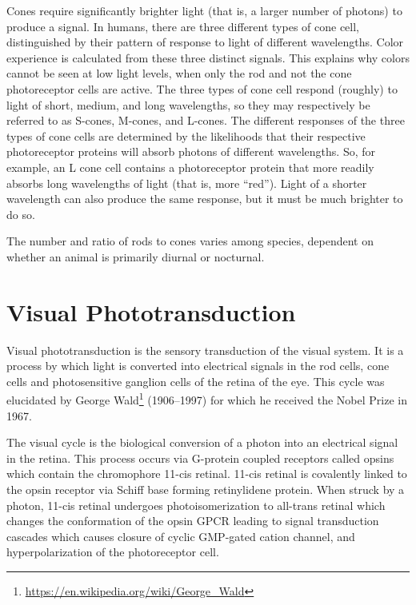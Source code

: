 \documentclass[]{book}
\let\rmarkdownfootnote\footnote%
\def\footnote{\protect\rmarkdownfootnote}
\renewcommand{\href}[2]{#2\footnote{\url{#1}}}
\begin{document}
Cones require significantly brighter light (that is, a larger number of photons) to produce a signal. In humans, there are three different types of cone cell, distinguished by their pattern of response to light of different wavelengths. Color experience is calculated from these three distinct signals. This explains why colors cannot be seen at low light levels, when only the rod and not the cone photoreceptor cells are active. The three types of cone cell respond (roughly) to light of short, medium, and long wavelengths, so they may respectively be referred to as S-cones, M-cones, and L-cones. The different responses of the three types of cone cells are determined by the likelihoods that their respective photoreceptor proteins will absorb photons of different wavelengths. So, for example, an L cone cell contains a photoreceptor protein that more readily absorbs long wavelengths of light (that is, more ``red''). Light of a shorter wavelength can also produce the same response, but it must be much brighter to do so.

The number and ratio of rods to cones varies among species, dependent on whether an animal is primarily diurnal or nocturnal.

\hypertarget{visual-phototransduction}{%
\section{Visual Phototransduction}\label{visual-phototransduction}}

Visual phototransduction is the sensory transduction of the visual system. It is a process by which light is converted into electrical signals in the rod cells, cone cells and photosensitive ganglion cells of the retina of the eye. This cycle was elucidated by \href{https://en.wikipedia.org/wiki/George_Wald}{George Wald} (1906--1997) for which he received the Nobel Prize in 1967.

The visual cycle is the biological conversion of a photon into an electrical signal in the retina. This process occurs via G-protein coupled receptors called opsins which contain the chromophore 11-cis retinal. 11-cis retinal is covalently linked to the opsin receptor via Schiff base forming retinylidene protein. When struck by a photon, 11-cis retinal undergoes photoisomerization to all-trans retinal which changes the conformation of the opsin GPCR leading to signal transduction cascades which causes closure of cyclic GMP-gated cation channel, and hyperpolarization of the photoreceptor cell.
\end{document}

